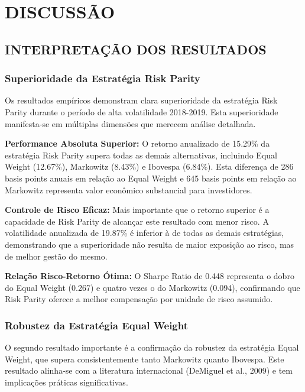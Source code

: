 
\chapter{DISCUSSÃO}

\section{INTERPRETAÇÃO DOS RESULTADOS}

\subsection{Superioridade da Estratégia Risk Parity}

Os resultados empíricos demonstram clara superioridade da estratégia Risk Parity durante o período de alta volatilidade 2018-2019. Esta superioridade manifesta-se em múltiplas dimensões que merecem análise detalhada.

\textbf{Performance Absoluta Superior:} O retorno anualizado de 15.29\% da estratégia Risk Parity supera todas as demais alternativas, incluindo Equal Weight (12.67\%), Markowitz (8.43\%) e Ibovespa (6.84\%). Esta diferença de 286 basis points anuais em relação ao Equal Weight e 645 basis points em relação ao Markowitz representa valor econômico substancial para investidores.

\textbf{Controle de Risco Eficaz:} Mais importante que o retorno superior é a capacidade de Risk Parity de alcançar este resultado com menor risco. A volatilidade anualizada de 19.87\% é inferior à de todas as demais estratégias, demonstrando que a superioridade não resulta de maior exposição ao risco, mas de melhor gestão do mesmo.

\textbf{Relação Risco-Retorno Ótima:} O Sharpe Ratio de 0.448 representa o dobro do Equal Weight (0.267) e quatro vezes o do Markowitz (0.094), confirmando que Risk Parity oferece a melhor compensação por unidade de risco assumido.

\subsection{Robustez da Estratégia Equal Weight}

O segundo resultado importante é a confirmação da robustez da estratégia Equal Weight, que supera consistentemente tanto Markowitz quanto Ibovespa. Este resultado alinha-se com a literatura internacional (DeMiguel et al., 2009) e tem implicações práticas significativas.

